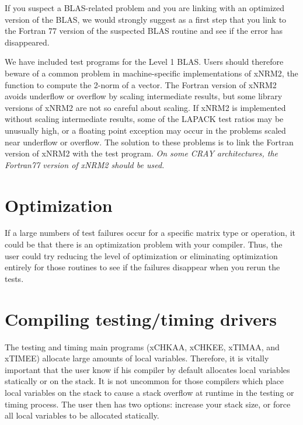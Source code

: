 \documentclass[11pt]{report}
\begin{document}
If you suspect a BLAS-related problem and you are linking
with an optimized version of the BLAS, we would strongly suggest
as a first step that you link to the Fortran 77 version of
the suspected BLAS routine and see if the error has disappeared.

We have included test programs for the Level 1 BLAS.
Users should therefore beware of a common problem in machine-specific
implementations of xNRM2,
the function to compute the 2-norm of a vector.
The Fortran version of xNRM2 avoids underflow or overflow
by scaling intermediate results, but some library versions of xNRM2
are not so careful about scaling.
If xNRM2 is implemented without scaling intermediate results, some of
the LAPACK test ratios may be unusually high, or
a floating point exception may occur in the problems scaled near
underflow or overflow.
The solution to these problems is to link the Fortran version of
xNRM2 with the test program.  \emph{On some CRAY architectures, the Fortran77
version of xNRM2 should be used.}

\section{Optimization}

If a large numbers of test failures occur for a specific matrix type
or operation, it could be that there is an optimization problem with
your compiler.  Thus, the user could try reducing the level of
optimization or eliminating optimization entirely for those routines
to see if the failures disappear when you rerun the tests.


\section{Compiling testing/timing drivers}

The testing and timing main programs (xCHKAA, xCHKEE, xTIMAA, and
xTIMEE)
allocate large amounts of local variables.  Therefore, it is vitally
important that the user know if his compiler by default allocates local
variables statically or on the stack.  It is not uncommon for those
compilers which place local variables on the stack to cause a stack
overflow at runtime in the testing or timing process.  The user then
has two options:  increase your stack size, or force all local variables
to be allocated statically.
\end{document}
